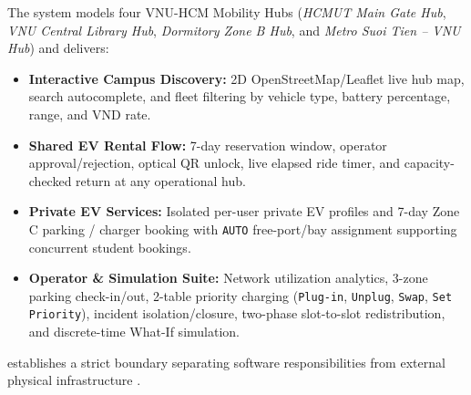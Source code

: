 \label{subsec:scope}
The system models four VNU-HCM Mobility Hubs (\textit{HCMUT Main Gate Hub}, \textit{VNU Central Library Hub}, \textit{Dormitory Zone B Hub}, and \textit{Metro Suoi Tien -- VNU Hub}) and delivers:
\begin{itemize}
  \item \textbf{Interactive Campus Discovery:} 2D OpenStreetMap/Leaflet live hub map, search autocomplete, and fleet filtering by vehicle type, battery percentage, range, and VND rate.
  \item \textbf{Shared EV Rental Flow:} 7-day reservation window, operator approval/rejection, optical QR unlock, live elapsed ride timer, and capacity-checked return at any operational hub.
  \item \textbf{Private EV Services:} Isolated per-user private EV profiles and 7-day Zone C parking / charger booking with \texttt{AUTO} free-port/bay assignment supporting concurrent student bookings.
  \item \textbf{Operator \& Simulation Suite:} Network utilization analytics, 3-zone parking check-in/out, 2-table priority charging (\texttt{Plug-in}, \texttt{Unplug}, \texttt{Swap}, \texttt{Set Priority}), incident isolation/closure, two-phase slot-to-slot redistribution, and discrete-time What-If simulation.
\end{itemize}

\label{subsec:system-boundary}
 establishes a strict boundary separating software responsibilities from external physical infrastructure \cite{sommerville2016}.

